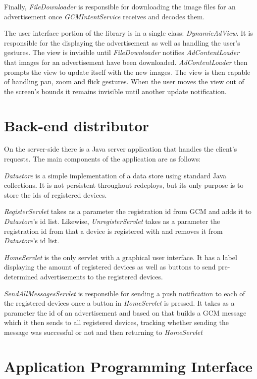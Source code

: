 Finally, \textit{FileDownloader} is responsible for downloading the image files for an advertisement once \textit{GCMIntentService} receives and decodes them.

The user interface portion of the library is in a single class: \textit{DynamicAdView}. It is responsible for the displaying the advertisement as well as handling the user's gestures. The view is invisible until \textit{FileDownloader} notifies \textit{AdContentLoader} that images for an advertisement have been downloaded. \textit{AdContentLoader} then prompts the view to update itself with the new images. The view is then capable of handling pan, zoom and flick gestures. When the user moves the view out of the screen's bounds it remains invisible until another update notification.

\section{Back-end distributor}

On the server-side there is a Java server application that handles the client's requests. The main components of the application are as follows:

\textit{Datastore} is a simple implementation of a data store using standard Java collections. It is not persistent throughout redeploys, but its only purpose is to store the ids of registered devices.

\textit{RegisterServlet} takes as a parameter the registration id from GCM and adds it to \textit{Datastore}'s id list. Likewise, \textit{UnregisterServlet} takes as a parameter the registration id from that a device is registered with and removes it from \textit{Datastore}'s id list.

\textit{HomeServlet} is the only servlet with a graphical user interface. It has a label displaying the amount of registered devices as well as buttons to send pre-determined advertisements to the registered devices.

\textit{SendAllMessagesServlet} is responsible for sending a push notification to each of the registered devices once a button in \textit{HomeServlet} is pressed. It takes as a parameter the id of an advertisement and based on that builds a GCM message which it then sends to all registered devices, tracking whether sending the message was successful or not and then returning to \textit{HomeServlet}

\section{Application Programming Interface}

